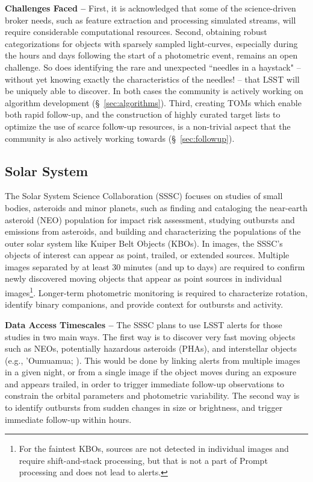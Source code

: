 {\bf Challenges Faced --}
First, it is acknowledged that some of the science-driven broker needs, such as feature extraction and processing simulated streams, will require considerable computational resources.
Second, obtaining robust categorizations for objects with sparsely sampled light-curves, especially during the hours and days following the start of a photometric event, remains an open challenge.
So does identifying the rare and unexpected ``needles in a haystack" -- without yet knowing exactly the characteristics of the needles! -- that LSST will be uniquely able to discover.
In both cases the community is actively working on algorithm development (\S~\ref{sec:algorithms}).
Third, creating TOMs which enable both rapid follow-up, and the construction of highly curated target lists to optimize the use of scarce follow-up resources, is a non-trivial aspect that the community is also actively working towards (\S~\ref{sec:followup}).


\subsection{Solar System}\label{ssec:sci_ss}

The Solar System Science Collaboration (SSSC) focuses on studies of small bodies, asteroids and minor planets, such as finding and cataloging the near-earth asteroid (NEO) population for impact risk assessment, studying outbursts and emissions from asteroids, and building and characterizing the populations of the outer solar system like Kuiper Belt Objects (KBOs).
In images, the SSSC's objects of interest can appear as point, trailed, or extended sources.
Multiple images separated by at least 30 minutes (and up to days) are required to confirm newly discovered moving objects that appear as point sources in individual images\footnote{For the faintest KBOs, sources are not detected in individual images and require shift-and-stack processing, but that is not a part of Prompt processing and does not lead to alerts.}.
Longer-term photometric monitoring is required to characterize rotation, identify binary companions, and provide context for outbursts and activity. 

{\bf Data Access Timescales --}
The SSSC plans to use LSST alerts for those studies in two main ways.
The first way is to discover very fast moving objects such as NEOs, potentially hazardous asteroids (PHAs), and interstellar objects (e.g., 'Oumuamua; \citealt{Meech2017}).
This would be done by linking alerts from multiple images in a given night, or from a single image if the object moves during an exposure and appears trailed, in order to trigger immediate follow-up observations to constrain the orbital parameters and photometric variability.
The second way is to identify outbursts from sudden changes in size or brightness, and trigger immediate follow-up within hours.

